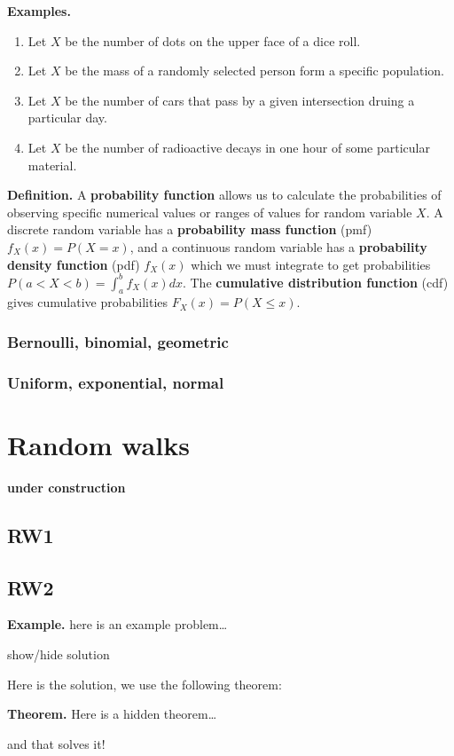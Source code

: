 \documentclass[
]{article}
\begin{document}
\textbf{Examples.}

\begin{enumerate}
\def\labelenumi{(\arabic{enumi})}
\item
  Let \(X\) be the number of dots on the upper face of a dice roll.
\item
  Let \(X\) be the mass of a randomly selected person form a specific population.
\item
  Let \(X\) be the number of cars that pass by a given intersection druing a particular day.
\item
  Let \(X\) be the number of radioactive decays in one hour of some particular material.
\end{enumerate}

\textbf{Definition.} A \textbf{probability function} allows us to calculate the probabilities of observing specific numerical values or ranges of values for random variable \(X\). A discrete random variable has a \textbf{probability mass function} (pmf) \(f_X(x)=P(X=x)\), and a continuous random variable has a \textbf{probability density function} (pdf) \(f_X(x)\) which we must integrate to get probabilities \(P(a<X<b)=\int_a^b f_X(x)dx\). The \textbf{cumulative distribution function} (cdf) gives cumulative probabilities \(F_X(x)=P(X\leq x)\).

\hypertarget{bernoulli-binomial-geometric}{%
\subsubsection{Bernoulli, binomial, geometric}\label{bernoulli-binomial-geometric}}

\hypertarget{uniform-exponential-normal}{%
\subsubsection{Uniform, exponential, normal}\label{uniform-exponential-normal}}

\hypertarget{random-walks}{%
\section{Random walks}\label{random-walks}}

\textbf{under construction}

\hypertarget{rw1}{%
\subsection{RW1}\label{rw1}}

\hypertarget{rw2}{%
\subsection{RW2}\label{rw2}}

\textbf{Example.}
here is an example problem\ldots{}

show/hide solution

Here is the solution, we use the following theorem:

\textbf{Theorem.} Here is a hidden theorem\ldots{}

and that solves it!
\end{document}
